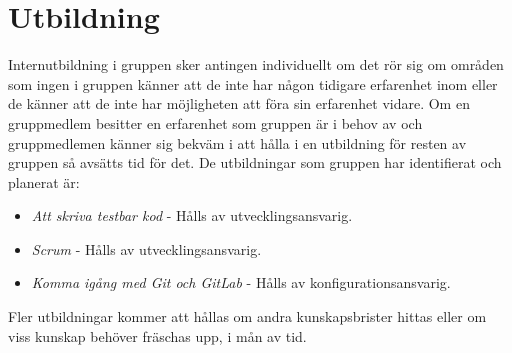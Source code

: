 \section{Utbildning}
Internutbildning i gruppen sker antingen individuellt om det rör sig om områden som ingen i gruppen känner att de inte har någon tidigare erfarenhet inom eller de känner att de inte har möjligheten att föra sin erfarenhet vidare. Om en gruppmedlem besitter en erfarenhet som gruppen är i behov av och gruppmedlemen känner sig bekväm i att hålla i en utbildning för resten av gruppen så avsätts tid för det. De utbildningar som gruppen har identifierat och planerat är:
\begin{itemize}
\item \textit{Att skriva testbar kod} - Hålls av utvecklingsansvarig.
\item \textit{Scrum} - Hålls av utvecklingsansvarig.
\item \textit{Komma igång med Git och GitLab} - Hålls av konfigurationsansvarig. 
\end{itemize}
Fler utbildningar kommer att hållas om andra kunskapsbrister hittas eller om viss kunskap behöver fräschas upp, i mån av tid.